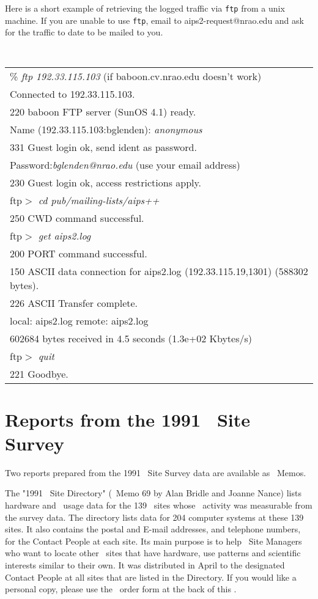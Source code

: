 Here is a short example of retrieving the logged traffic via {\tt ftp}
from a unix machine.
If you are unable to use {\tt ftp}, email to aips2-request@nrao.edu and ask
for the traffic to date to be mailed to you.

\tablestyle
{\tt
\begin{tabular}{l}
\% {\it ftp 192.33.115.103}  \hskip 2in (if baboon.cv.nrao.edu doesn't work)\\
Connected to 192.33.115.103. \\
220 baboon FTP server (SunOS 4.1) ready. \\
Name (192.33.115.103:bglenden): {\it anonymous} \\
331 Guest login ok, send ident as password. \\
Password:{\it bglenden@nrao.edu}  \hskip 2in (use your email address) \\
230 Guest login ok, access restrictions apply. \\
ftp$>$ {\it cd pub/mailing-lists/aips++} \\
250 CWD command successful. \\
ftp$>$ {\it get aips2.log} \\
200 PORT command successful.\\
150 ASCII data connection for aips2.log (192.33.115.19,1301) (588302 bytes). \\
226 ASCII Transfer complete.\\
local: aips2.log remote: aips2.log \\
602684 bytes received in 4.5 seconds (1.3e+02 Kbytes/s) \\
ftp$>$ {\it quit} \\
221 Goodbye. \\
\end{tabular}
}
\normalstyle

\section{Reports from the 1991 \AIPS\ Site Survey}

Two reports prepared from the 1991 \AIPS\  Site Survey data are available
as \AIPS\  Memos.

The "1991 \AIPS\  Site Directory" (\AIPS\  Memo 69 by Alan Bridle and Joanne
Nance) lists hardware and \AIPS\  usage data for the 139 \AIPS\  sites whose
\AIPS\  activity was measurable from the survey data.  The directory lists
data for 204 computer systems at these 139 sites.  It also contains the
postal and E-mail addresses, and telephone numbers, for the Contact
People at each site.  Its main purpose is to help \AIPS\  Site Managers who
want to locate other \AIPS\  sites that have hardware, use patterns and
scientific interests similar to their own.  It was distributed in April
to the designated Contact People at all sites that are listed in the
Directory.  If you would like a personal copy, please use the \AIPS\
order form at the back of this \Aipsletter.

